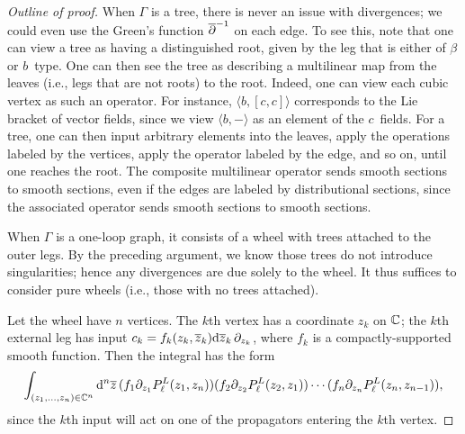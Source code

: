 \begin{proof}[Outline of proof]
When $\Gamma$ is a tree, there is never an issue with divergences; 
we could even use the Green's function $\overline{\partial}^{-1}$ on each edge.
To see this, note that one can view a tree as having a distinguished root,
given by the leg that is either of $\beta$ or $b$~type.
One can then see the tree as describing a multilinear map from the leaves (i.e., legs that are not roots) to the root.
Indeed, one can view each cubic vertex as such an operator.
For instance, $\langle b, [c,c]\rangle$ corresponds to the Lie bracket of vector fields,
since we view $\langle b,-\rangle$ as an element of the $c$~fields.
For a tree, one can then input arbitrary elements into the leaves, 
apply the operations labeled by the vertices,
apply the operator labeled by the edge, and so on,
until one reaches the root.
The composite multilinear operator sends smooth sections to smooth sections,
even if the edges are labeled by distributional sections,
since the associated operator sends smooth sections to smooth sections.

When $\Gamma$ is a one-loop graph, it consists of a wheel with trees attached to the outer legs.
By the preceding argument, we know those trees do not introduce singularities;
hence any divergences are due solely to the wheel.
It thus suffices to consider pure wheels (i.e., those with no trees attached).

Let the wheel have $n$ vertices. 
The $k$th vertex has a coordinate $z_k$ on $\mathbb C$;
the $k$th external leg has input $c_k = f_k(z_k,\overline{z}_k) {\rm d}\overline{z}_k\, \partial_{z_k}$, 
where $f_k$ is a compactly-supported smooth function.
Then the integral has the form
\[
\int_{(z_1,\ldots,z_n) \in \mathbb C^n}{\rm d}^n \overline{z} \,(f_1  \partial_{z_1} P_\ell^L(z_1,z_n))(f_2 \partial_{z_2} P_\ell^L(z_2,z_1)) \cdots (f_n\partial_{z_n} P_\ell^L(z_n,z_{n-1})),
\] 
since the $k$th input will act on one of the propagators entering the $k$th vertex.


\end{proof}
